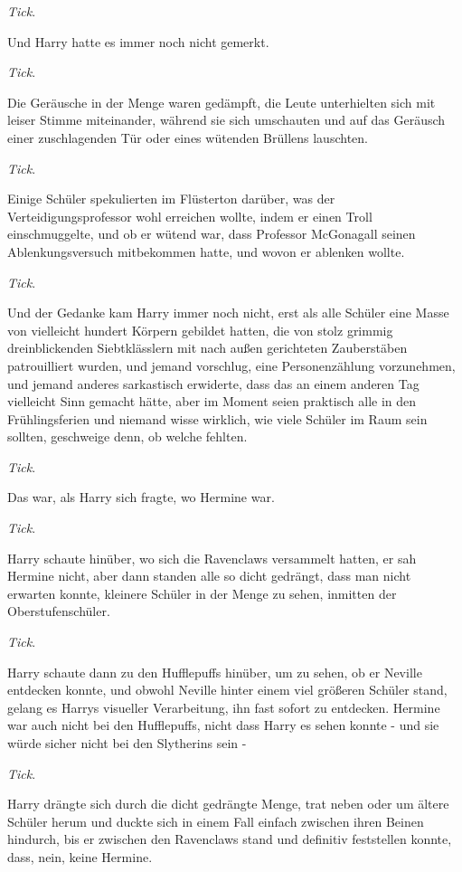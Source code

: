 {\emph{Tick}.

Und Harry hatte es immer noch nicht gemerkt.

\emph{Tick}.

Die Geräusche in der Menge waren gedämpft, die Leute unterhielten sich mit leiser Stimme miteinander, während sie sich umschauten und auf das Geräusch einer zuschlagenden Tür oder eines wütenden Brüllens lauschten.

\emph{Tick}.

Einige Schüler spekulierten im Flüsterton darüber, was der Verteidigungsprofessor wohl erreichen wollte, indem er einen Troll einschmuggelte, und ob er wütend war, dass Professor McGonagall seinen Ablenkungsversuch mitbekommen hatte, und wovon er ablenken wollte.

\emph{Tick}.

Und der Gedanke kam Harry immer noch nicht, erst als alle Schüler eine Masse von vielleicht hundert Körpern gebildet hatten, die von stolz grimmig dreinblickenden Siebtklässlern mit nach außen gerichteten Zauberstäben patrouilliert wurden, und jemand vorschlug, eine Personenzählung vorzunehmen, und jemand anderes sarkastisch erwiderte, dass das an einem anderen Tag vielleicht Sinn gemacht hätte, aber im Moment seien praktisch alle in den Frühlingsferien und niemand wisse wirklich, wie viele Schüler im Raum sein sollten, geschweige denn, ob welche fehlten.

\emph{Tick}.

Das war, als Harry sich fragte, wo Hermine war.

\emph{Tick}.

Harry schaute hinüber, wo sich die Ravenclaws versammelt hatten, er sah Hermine nicht, aber dann standen alle so dicht gedrängt, dass man nicht erwarten konnte, kleinere Schüler in der Menge zu sehen, inmitten der Oberstufenschüler.

\emph{Tick}.

Harry schaute dann zu den Hufflepuffs hinüber, um zu sehen, ob er Neville entdecken konnte, und obwohl Neville hinter einem viel größeren Schüler stand, gelang es Harrys visueller Verarbeitung, ihn fast sofort zu entdecken. Hermine war auch nicht bei den Hufflepuffs, nicht dass Harry es sehen konnte - und sie würde sicher nicht bei den Slytherins sein -

\emph{Tick}.

Harry drängte sich durch die dicht gedrängte Menge, trat neben oder um ältere Schüler herum und duckte sich in einem Fall einfach zwischen ihren Beinen hindurch, bis er zwischen den Ravenclaws stand und definitiv feststellen konnte, dass, nein, keine Hermine.

}

